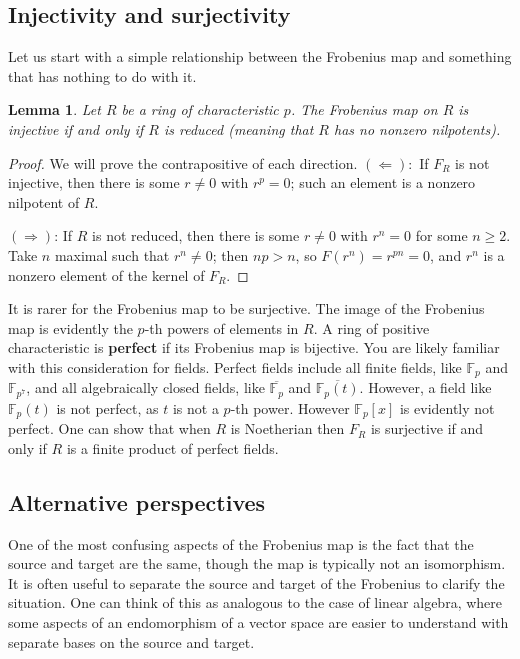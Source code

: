 \documentclass[12pt]{amsart}
\newtheorem{lemma}[theorem]{Lemma}
\theoremstyle{definition}
\numberwithin{equation}{theorem}
\def\FF{\mathbb{F}}
\begin{document}
\subsection*{Injectivity and surjectivity}
Let us start with a simple relationship between the Frobenius map and something that has nothing to do with it.

\begin{lemma} Let $R$ be a ring of characteristic $p$. The Frobenius map on $R$ is injective if and only if $R$ is reduced (meaning that $R$ has no nonzero nilpotents).
\end{lemma}
\begin{proof} We will prove the contrapositive of each direction.
$(\Leftarrow):$ If $F_R$ is not injective, then there is some $r\neq 0$ with $r^p=0$; such an element is a nonzero nilpotent of $R$.

$(\Rightarrow)$: If $R$ is not reduced, then there is some $r\neq 0$ with $r^n=0$ for some $n\geq 2$. Take $n$ maximal such that $r^n\neq 0$; then $np>n$, so $F(r^n) = r^{pn} =0$, and $r^n$ is a nonzero element of the kernel of $F_R$.
\end{proof}

It is rarer for the Frobenius map to be surjective. The image of the Frobenius map is evidently the $p$-th powers of elements in $R$. A ring of positive characteristic is  \textbf{perfect} if its Frobenius map is bijective.
You are likely familiar with this consideration for fields. Perfect fields include all finite fields, like $\FF_p$ and $\FF_{p^7}$, and all algebraically closed fields, like $\overline{\FF_p}$ and $\overline{\FF_p(t)}$. However, a field like $\FF_p(t)$ is not perfect, as $t$ is not a $p$-th power. However $\FF_p[x]$ is evidently not perfect. One can show that when $R$ is Noetherian then $F_R$ is surjective if and only if $R$ is a finite product of perfect fields.


\subsection*{Alternative perspectives}
One of the most confusing aspects of the Frobenius map is the fact that the source and target are the same, though the map is typically not an isomorphism. It is often useful to separate the source and target of the Frobenius to clarify the situation. One can think of this as analogous to the case of linear algebra, where some aspects of an endomorphism of a vector space are easier to understand with separate bases on the source and target.
\end{document}
